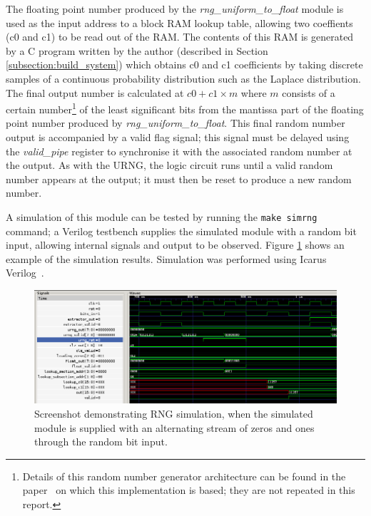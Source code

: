 \documentclass[12pt]{article}
\begin{document}
        The floating point number produced by the \textit{rng\_uniform\_to\_float} module is used as the input address to a block RAM lookup table, allowing two coeffients (c0 and c1) to be read out of the RAM. The contents of this RAM is generated by a C program written by the author (described in Section \ref{subsection:build_system}) which obtains c0 and c1 coefficients by taking discrete samples of a continuous probability distribution such as the Laplace distribution. The final output number is calculated at $c0 + c1 \times m$ where $m$ consists of a certain number\footnote{Details of this random number generator architecture can be found in the paper~\cite{DeSchryver} on which this implementation is based; they are not repeated in this report.} of the least significant bits from the mantissa part of the floating point number produced by \textit{rng\_uniform\_to\_float}. This final random number output is accompanied by a valid flag signal; this signal must be delayed using the \textit{valid\_pipe} register to synchronise it with the associated random number at the output. As with the URNG, the logic circuit runs until a valid random number appears at the output; it must then be reset to produce a new random number.

        A simulation of this module can be tested by running the \texttt{make simrng} command; a Verilog testbench supplies the simulated module with a random bit input, allowing internal signals and output to be observed. Figure \ref{fig:rng_test} shows an example of the simulation results. Simulation was performed using Icarus Verilog~\cite{icarus}.

        \begin{figure}[H]
          \centering
          \includegraphics[width=\textwidth]{fig/rng_test.png}
          \caption{Screenshot demonstrating RNG simulation, when the simulated module is supplied with an alternating stream of zeros and ones through the random bit input.}
          \label{fig:rng_test}
        \end{figure}
\end{document}
